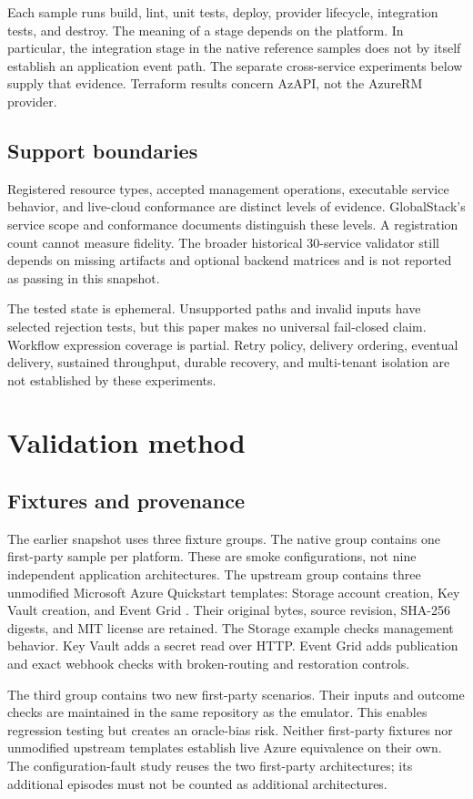 \documentclass[10pt,a4paper]{article}
\begin{document}
Each sample runs build, lint, unit tests, deploy, provider lifecycle, integration tests, and destroy. The meaning of a stage depends on the platform. In particular, the integration stage in the native reference samples does not by itself establish an application event path. The separate cross-service experiments below supply that evidence. Terraform results concern AzAPI, not the AzureRM provider.

\subsection{Support boundaries}
Registered resource types, accepted management operations, executable service behavior, and live-cloud conformance are distinct levels of evidence. GlobalStack's service scope and conformance documents distinguish these levels. A registration count cannot measure fidelity. The broader historical 30-service validator still depends on missing artifacts and optional backend matrices and is not reported as passing in this snapshot.

The tested state is ephemeral. Unsupported paths and invalid inputs have selected rejection tests, but this paper makes no universal fail-closed claim. Workflow expression coverage is partial. Retry policy, delivery ordering, eventual delivery, sustained throughput, durable recovery, and multi-tenant isolation are not established by these experiments.

\section{Validation method}
\subsection{Fixtures and provenance}
The earlier snapshot uses three fixture groups. The native group contains one first-party sample per platform. These are smoke configurations, not nine independent application architectures. The upstream group contains three unmodified Microsoft Azure Quickstart templates: Storage account creation, Key Vault creation, and Event Grid \cite{quickstarts}. Their original bytes, source revision, SHA-256 digests, and MIT license are retained. The Storage example checks management behavior. Key Vault adds a secret read over HTTP. Event Grid adds publication and exact webhook checks with broken-routing and restoration controls.

The third group contains two new first-party scenarios. Their inputs and outcome checks are maintained in the same repository as the emulator. This enables regression testing but creates an oracle-bias risk. Neither first-party fixtures nor unmodified upstream templates establish live Azure equivalence on their own. The configuration-fault study reuses the two first-party architectures; its additional episodes must not be counted as additional architectures.
\end{document}
